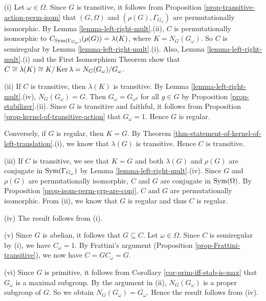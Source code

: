\begin{sketch}
(i) Let $\omega\in\Omega$. Since $G$ is transitive, it follows from Proposition \ref{prop-transitive-action-perm-isom} that $(G,\Omega)$ and $(\rho(G),\Gamma_{G_\omega})$ are permutationally isomorphic. By Lemma \ref{lemma-left-right-mult}.(ii), $C$ is permutationally isomorphic to $C_{\operatorname{Sym}(\Gamma_{G_\omega})}(\rho(G)) = \lambda(K)$, where $K = N_G(G_\omega)$. So $C$ is semiregular by Lemma \ref{lemma-left-right-mult}.(i). Also, Lemma \ref{lemma-left-right-mult}.(i) and the First Isomorphism Theorem show that
	$
		C \cong \lambda(K) \cong K/\operatorname{Ker} \lambda  = N_G(G_\omega)/G_\omega$.
	
	(ii) If $C$ is transitive, then $\lambda(K)$ is transitive. By Lemma \ref{lemma-left-right-mult}.(iv), $N_G(G_\omega) = G$.  Then $G_\omega =G_{\omega^g}$ for all $g\in G$ by Proposition \ref{prop-stabilizer}.(ii). Since $G$ is transitive and faithful, it follows from Proposition \ref{prop-kernel-of-transitive-action} that $G_\omega = 1$. Hence $G$ is regular. 
	
	Conversely, if $G$ is regular, then $K = G$. By Theorem \ref{thm-statement-of-kernel-of-left-translation}.(i), we know that $\lambda(G)$ is transitive. Hence $C$ is transitive.
	
	(iii) If $C$ is transitive, we see that $K = G$ and both $\lambda(G)$ and $\rho(G)$ are conjugate in $\operatorname{Sym}(\Gamma_{G_\omega})$ by Lemma \ref{lemma-left-right-mult}.(iv). Since $G$ and $\rho(G)$ are permutationally isomorphic, $C$ and $G$ are conjugate in $\operatorname{Sym}(\Omega)$. By Proposition \ref{prop-isom-perm-grp-are-conj}, $C$ and $G$ are permutationally isomorphic. From (ii), we know that $G$ is regular and thus $C$ is regular.
	
	(iv) The result follows from (i).
	
	(v) Since $G$ is abelian, it follows that $G \subseteq C$. Let $\omega \in \Omega$.  Since $C$ is semiregular by (i), we have $C_\omega = 1$. By Frattini's argument (Proposition \ref{prop-Frattini-transitive}), we now have $C = GC_\omega = G$.
	
	(vi) Since $G$ is primitive, it follows from Corollary \ref{cor-prim-iff-stab-is-max} that $G_\omega$ is a maximal subgroup. By the argument in (ii), $N_G(G_\omega)$ is a proper subgroup of $G$. So we obtain $N_G(G_\omega) = G_\omega$. Hence the result follows from (iv).
\end{sketch}



